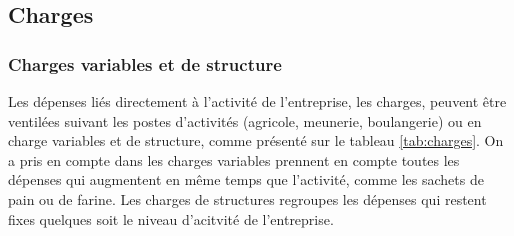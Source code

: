 \documentclass{book}
\begin{document}
\subsection{Charges}

\subsubsection{Charges variables et de structure}

Les dépenses liés directement à l'activité de l'entreprise, les charges, peuvent être ventilées suivant les postes d'activités (agricole, meunerie, boulangerie) ou en charge variables et de structure, comme présenté sur le tableau \ref{tab:charges}. On a pris en compte dans les charges variables prennent en compte toutes les dépenses qui augmentent en même temps que l'activité, comme les sachets de pain ou de farine. Les charges de structures regroupes les dépenses qui restent fixes quelques soit le niveau d'acitvité de l'entreprise. 
\end{document}
